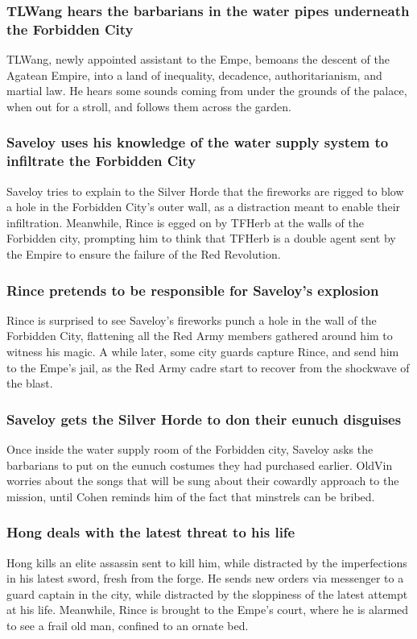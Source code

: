 \subsubsection{\Gls{TLWang} hears the barbarians in the water pipes underneath the Forbidden City}
\Gls{TLWang}, newly appointed assistant to the \Gls{Empe}, bemoans the descent of the Agatean
Empire, into a land of inequality, decadence, authoritarianism, and martial law. He hears some
sounds coming from under the grounds of the palace, when out for a stroll, and follows them across
the garden.

\subsubsection{\Gls{Saveloy} uses his knowledge of the water supply system to infiltrate the
    Forbidden City}
\Gls{Saveloy} tries to explain to the Silver Horde that the fireworks are rigged to blow a hole in
the Forbidden City's outer wall, as a distraction meant to enable their infiltration. Meanwhile,
\Gls{Rince} is egged on by \Gls{TFHerb} at the walls of the Forbidden city, prompting him to think
that \Gls{TFHerb} is a double agent sent by the Empire to ensure the failure of the Red Revolution.

\subsubsection{\Gls{Rince} pretends to be responsible for \Gls{Saveloy}'s explosion}
\Gls{Rince} is surprised to see \Gls{Saveloy}'s fireworks punch a hole in the wall of the Forbidden
City, flattening all the Red Army members gathered around him to witness his magic. A while later,
some city guards capture \Gls{Rince}, and send him to the \Gls{Empe}'s jail, as the Red Army
cadre start to recover from the shockwave of the blast.

\subsubsection{\Gls{Saveloy} gets the Silver Horde to don their eunuch disguises}
Once inside the water supply room of the Forbidden city, \Gls{Saveloy} asks the barbarians to put
on the eunuch costumes they had purchased earlier. \Gls{OldVin} worries about the songs that will
be sung about their cowardly approach to the mission, until \Gls{Cohen} reminds him of the fact
that minstrels can be bribed.

\subsubsection{\Gls{Hong} deals with the latest threat to his life}
\Gls{Hong} kills an elite assassin sent to kill him, while distracted by the imperfections in his
latest sword, fresh from the forge. He sends new orders via messenger to a guard captain in the
city, while distracted by the sloppiness of the latest attempt at his life. Meanwhile, \Gls{Rince}
is brought to the \Gls{Empe}'s court, where he is alarmed to see a frail old man, confined to an
ornate bed.

